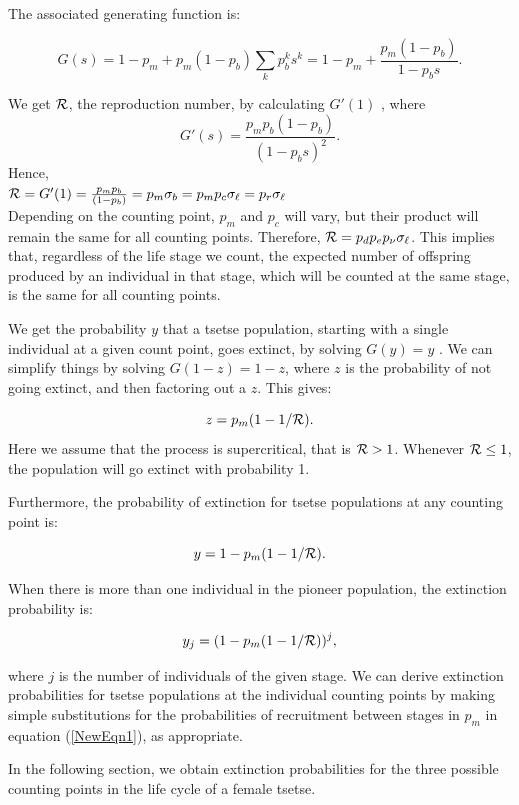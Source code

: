 \documentclass[smallextended]{svjour3}
\begin{document}
The associated generating function  is:

$$G(s) = 1-p_m + p_m (1-p_b) \sum_k p_b^k s^k = 1-p_m + \frac{p_m (1-p_b)}{1-p_b s}.$$

We get ${\cal R}$, the reproduction number, by calculating $G'(1)$ \cite{bartlett1949some}, where $$G'(s) = \frac{p_m p_b (1-p_b)}{(1-p_b s)^2}.$$  Hence, \\

$ {\cal R}= G'(1) = \frac{p_m p_b}{(1-p_b)} = p_m \sigma_b = p_mp_c \sigma_\ell =  p_r\sigma_\ell$ \\

Depending on the counting point, $p_m$ and $p_c$ will vary, but their product will remain the same for all counting  points. Therefore, ${\cal R} =p_dp_ep_{\nu} \sigma_{\ell}$. This implies that, regardless of the life stage we count, the expected number of offspring produced by an individual in that stage, which will be counted at the same stage, is the same for all counting points.


We get the probability $y$ that a tsetse population, starting with a single individual at a given count point, goes extinct, by solving $G(y) = y$ \cite{bartlett1949some}. We can simplify things by solving   $G(1-z) = 1-z$, where $z$ is the probability of not going extinct, and then factoring out a $z$. This gives:

$$ z = p_m(1-1/{\cal R}).$$  
Here we assume that the process is supercritical, that is ${\cal R} > 1$. Whenever ${\cal R} \leq 1$, the population will go extinct with probability 1. 

Furthermore, the probability of extinction for tsetse populations at any counting point is:

\begin{equation}
	\label{NewEqn1}	
	y = 1 - p_m(1-1/{\cal R}).	
\end{equation}

When there is more than one individual in the pioneer population, the extinction probability is:

$$y_j = (1 - p_m(1-1/{\cal R}))^j,$$

where $j$ is the number of individuals of the given stage. We can derive extinction probabilities for tsetse populations at the individual counting points by making simple substitutions for the probabilities of recruitment  between stages in $p_m$  in equation (\ref{NewEqn1}), as appropriate. 

In the following section, we obtain extinction probabilities  for the three possible counting points in the life cycle of a female tsetse.
\end{document}
